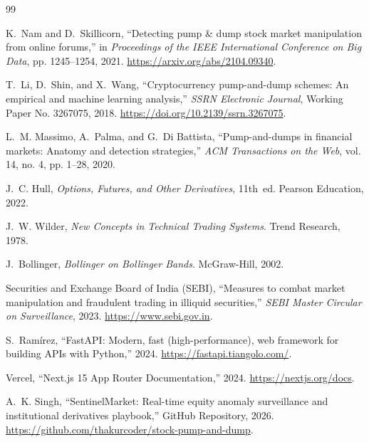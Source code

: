 \begin{thebibliography}{99}

K.~Nam and D.~Skillicorn, ``Detecting pump \& dump stock market manipulation from online forums,'' in \emph{Proceedings of the IEEE International Conference on Big Data}, pp. 1245--1254, 2021. \url{https://arxiv.org/abs/2104.09340}.

T.~Li, D.~Shin, and X.~Wang, ``Cryptocurrency pump-and-dump schemes: An empirical and machine learning analysis,'' \emph{SSRN Electronic Journal}, Working Paper No. 3267075, 2018. \url{https://doi.org/10.2139/ssrn.3267075}.

L.~M. Massimo, A.~Palma, and G.~Di Battista, ``Pump-and-dumps in financial markets: Anatomy and detection strategies,'' \emph{ACM Transactions on the Web}, vol. 14, no. 4, pp. 1--28, 2020.

J.~C. Hull, \emph{Options, Futures, and Other Derivatives}, 11th~ed. Pearson Education, 2022.

J.~W. Wilder, \emph{New Concepts in Technical Trading Systems}. Trend Research, 1978.

J.~Bollinger, \emph{Bollinger on Bollinger Bands}. McGraw-Hill, 2002.

Securities and Exchange Board of India (SEBI), ``Measures to combat market manipulation and fraudulent trading in illiquid securities,'' \emph{SEBI Master Circular on Surveillance}, 2023. \url{https://www.sebi.gov.in}.

S.~Ramírez, ``FastAPI: Modern, fast (high-performance), web framework for building APIs with Python,'' 2024. \url{https://fastapi.tiangolo.com/}.

Vercel, ``Next.js 15 App Router Documentation,'' 2024. \url{https://nextjs.org/docs}.

A.~K. Singh, ``SentinelMarket: Real-time equity anomaly surveillance and institutional derivatives playbook,'' GitHub Repository, 2026. \url{https://github.com/thakurcoder/stock-pump-and-dump}.

\end{thebibliography}
